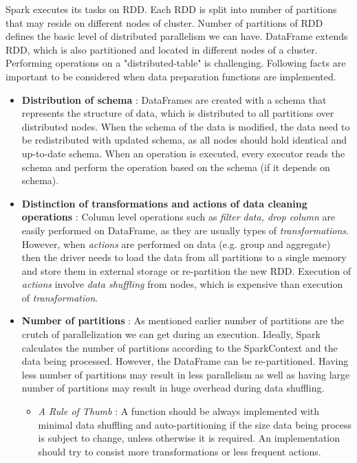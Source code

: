  Spark executes its tasks on RDD. Each RDD is split into number of partitions that may reside on different nodes of cluster. Number of partitions of RDD defines the basic level of distributed parallelism we can have. DataFrame extends RDD, which is also partitioned and located in different nodes of a cluster. Performing operations on a "distributed-table" is challenging. Following facts are important to be considered when data preparation functions are implemented.
\begin{itemize}
\item \textbf{Distribution of schema} : DataFrames are created with a schema that represents the structure of data, which is distributed to all partitions over distributed nodes. When the schema of the data is modified, the data need to be redistributed with updated schema, as all nodes should hold identical and up-to-date schema. When an operation is executed, every executor reads the schema and perform the operation based on the schema (if it depends on schema). 
\item \textbf{Distinction of transformations and actions of data cleaning operations} : Column level operations such as \textit{filter data, drop column} are easily performed on DataFrame, as they are usually types of \textit{transformations}. However, when \textit{actions} are performed on data (e.g. group and aggregate) then the driver needs to load the data from all partitions to a single memory and store them in external storage or re-partition the new RDD. Execution of \textit{actions} involve\textit{ data shuffling} from nodes, which is expensive than execution of \textit{transformation}. 
\item \textbf{Number of partitions} : As mentioned earlier number of partitions are the crutch of parallelization we can get during an execution. Ideally, Spark calculates the number of partitions according to the SparkContext and the data being processed. However, the DataFrame can be re-partitioned.  Having less number of partitions may result in less parallelism as well as having large number of partitions may result in huge overhead during data shuffling. 
\begin{itemize}
\item \textit{A Rule of Thumb} : A function should be always implemented with minimal data shuffling and auto-partitioning if the size data being process is subject to change, unless otherwise it is required. An implementation should try to consist more transformations or less frequent actions. 
\end{itemize}

\end{itemize}
